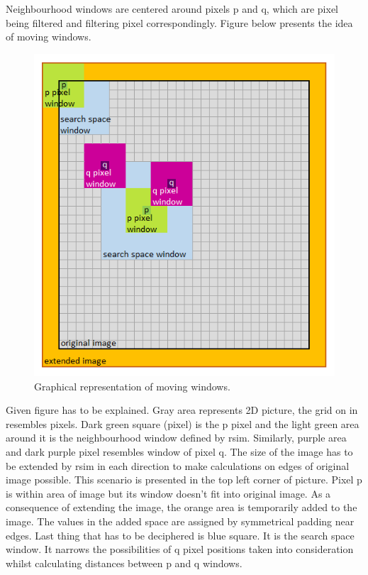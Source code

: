 Neighbourhood windows are centered around pixels p and q, which are pixel being filtered and filtering pixel correspondingly. Figure below presents the idea of moving windows.

\begin{figure}[H]
	\centering{}
	\includegraphics[scale=0.7]{figures/module05/m5windows}
	\caption{Graphical representation of moving windows.} 
\end{figure}

Given figure has to be explained. Gray area represents 2D picture, the grid on in resembles pixels. Dark green square (pixel) is the p pixel and the light green area around it is the neighbourhood window defined by rsim. Similarly, purple area and dark purple pixel resembles window of pixel q. The size of the image has to be extended by rsim in each direction to make calculations on edges of original image possible. This scenario is presented in the top left corner of picture. Pixel p is within area of image but its window doesn't fit into original image. As a consequence of extending the image, the orange area is temporarily added to the image. The values in the added space are assigned by symmetrical padding near edges. Last thing that has to be deciphered is blue square. It is the search space window. It narrows the possibilities of q pixel positions taken into consideration whilst calculating distances between p and q windows.

